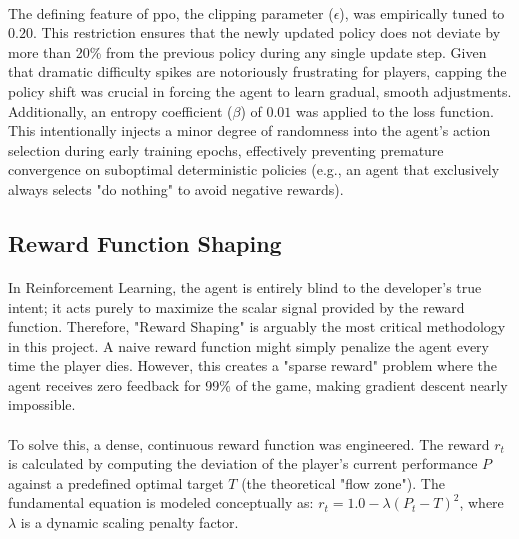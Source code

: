 \paragraph{} The defining feature of \ac{ppo}, the clipping parameter ($\epsilon$), was empirically tuned to $0.20$. This restriction ensures that the newly updated policy does not deviate by more than 20\% from the previous policy during any single update step. Given that dramatic difficulty spikes are notoriously frustrating for players, capping the policy shift was crucial in forcing the agent to learn gradual, smooth adjustments. Additionally, an entropy coefficient ($\beta$) of $0.01$ was applied to the loss function. This intentionally injects a minor degree of randomness into the agent's action selection during early training epochs, effectively preventing premature convergence on suboptimal deterministic policies (e.g., an agent that exclusively always selects "do nothing" to avoid negative rewards).

\subsection{Reward Function Shaping}
\paragraph{} In Reinforcement Learning, the agent is entirely blind to the developer's true intent; it acts purely to maximize the scalar signal provided by the reward function. Therefore, "Reward Shaping" is arguably the most critical methodology in this project. A naive reward function might simply penalize the agent every time the player dies. However, this creates a "sparse reward" problem where the agent receives zero feedback for 99\% of the game, making gradient descent nearly impossible.
\paragraph{} To solve this, a dense, continuous reward function was engineered. The reward $r_t$ is calculated by computing the deviation of the player's current performance $P$ against a predefined optimal target $T$ (the theoretical "flow zone"). The fundamental equation is modeled conceptually as: $r_t = 1.0 - \lambda (P_t - T)^2$, where $\lambda$ is a dynamic scaling penalty factor. 
